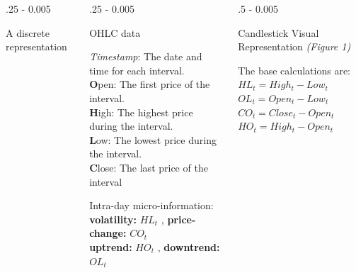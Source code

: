 \documentclass{postertheme}\usepackage[]{graphicx}\usepackage[]{color}
\begin{document}
\begin{frame}
\begin{columns}[onlytextwidth]
\begin{column}{.25 \textwidth - 0.005 \textwidth}
\begin{block}{A discrete representation}
    \end{block}
  \end{column}
  
  \begin{column}{.25 \textwidth - 0.005 \textwidth}
  \begin{block}{OHLC data} \footnotesize
  
      \textit{Timestamp}: The date and time for each interval. \\
      \textbf{O}pen: The first price of the interval. \\
      \textbf{H}igh: The highest price during the interval. \\
      \textbf{L}ow: The lowest price during the interval. \\
      \textbf{C}lose: The last price of the interval

      Intra-day micro-information: \\
     \textbf{volatility:}  $HL_{t}$ , \textbf{price-change:} $ CO_{t}$ \\
     \textbf{uptrend:} $HO_{t}$ , \textbf{downtrend:} $ OL_{t}$

  \end{block}
  \end{column}

  \begin{column}{.5 \textwidth - 0.005 \textwidth}
    \begin{block}{Candlestick Visual Representation \footnotesize \textit{(Figure 1)}} 
    
    \begin{minipage}[h]{0.25 \textwidth} \footnotesize
      
      The base calculations are: \\
      
      $HL_{t} = High_{t} - Low_{t}$ \\
      $OL_{t} = Open_{t} - Low_{t}$ \\
      $CO_{t} = Close_{t} - Open_{t}$ \\
      $HO_{t} = High_{t} - Open_{t}$
    

\end{minipage}
\end{block}
\end{column}
\end{columns}
\end{frame}
\end{document}
